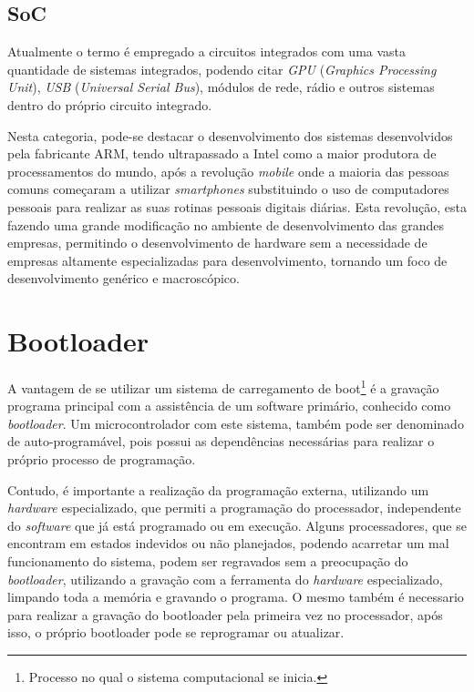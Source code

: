 \subsection{SoC}

Atualmente o termo é empregado a circuitos integrados com uma vasta quantidade de sistemas integrados, podendo citar  \textit{GPU} (\textit{Graphics Processing Unit}), \textit{USB} (\textit{Universal Serial Bus}), módulos de rede, rádio e outros sistemas dentro do próprio circuito integrado.


Nesta categoria, pode-se destacar o desenvolvimento dos sistemas desenvolvidos pela fabricante ARM, tendo ultrapassado a Intel como a maior produtora de processamentos do mundo, após a revolução \textit{mobile} onde a maioria das pessoas comuns começaram a utilizar \textit{smartphones} substituindo o uso de computadores pessoais para realizar as suas rotinas pessoais digitais diárias. Esta revolução, esta fazendo uma grande modificação no ambiente de desenvolvimento das grandes empresas, permitindo o desenvolvimento de hardware sem a necessidade de empresas altamente especializadas para desenvolvimento, tornando um foco de desenvolvimento genérico e macroscópico.


\section{Bootloader}

A vantagem de se utilizar um sistema de carregamento de boot\footnote{Processo no qual o sistema computacional se inicia.} é
a gravação programa principal com a assistência de um software primário, conhecido como \textit{bootloader}. Um microcontrolador
com este sistema, também pode ser denominado de auto-programável, pois possui as dependências necessárias para realizar o próprio
processo de programação.

Contudo, é importante a realização da programação externa, utilizando um \textit{hardware} especializado, que permiti a programação do processador, independente do \textit{software} que já está programado ou em execução. Alguns processadores, que se encontram em estados indevidos ou não planejados, podendo acarretar um mal funcionamento do sistema, podem ser regravados sem a preocupação do \textit{bootloader}, utilizando a gravação com a ferramenta do \textit{hardware} especializado, limpando toda a memória e gravando o programa. O mesmo também é necessario para realizar a gravação do bootloader pela primeira vez no processador, após isso, o próprio bootloader pode se reprogramar ou atualizar.

